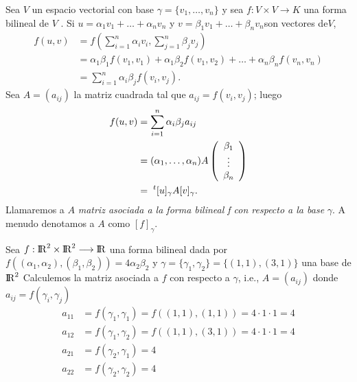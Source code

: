 			Sea $ V $ un espacio vectorial con base $ \gamma = \{v_{1} , \ldots, v_{n} \} $ y sea $ f : V \times V \rightarrow K $ una
			forma bilineal de $ V $ . Si $ u = \alpha_{1}v_{1} + \ldots + \alpha_{n} v_{n} $ y $ v = \beta_{1}v_{1} + \ldots + \beta_{n} v_{n}  $son vectores de$  V  $,
		\begin{align*}
		f(u, v) &=  f(\sum_{i=1}^{n}\alpha_{i}v_{i}, \sum_{j=1}^{n}\beta_{j}v_{j}) \\
					&= \alpha_{1} \beta_{1} f (v_{1} , v_{1 }) + \alpha_{1} \beta_{2} f (v_{1} , v_{2} ) + \ldots+ \alpha_{n}\beta_{n} f (v_{n} , v_{n} )
					\\
					&=\sum_{i=1}^{n}\alpha_{i}\beta_{j}f(v_{i}, v_{j}).
		\end{align*}
		Sea $ A = (a_{ij} ) $ la matriz cuadrada tal que $ a_{ij} = f (v_{i} , v_{j} ) $; luego
		\begin{align*}
		f(u,v) &= \sum_{i=1}^{n}\alpha_{i}\beta_{j} a_{ij} \\
		            &= (\alpha_{1},\ldots,\alpha_{n})A\left(\begin{array}{c}
		            		\beta_{1} \\ \vdots \\ \beta_{n}
		            \end{array}\right)\\
		            &=\textcolor{white}{.}^{t}[u]_{\gamma}A[v]_{\gamma}.
		\end{align*}
		Llamaremos a $ A $ \textit{matriz asociada a la forma bilineal f con respecto a la base} $\gamma$. A menudo denotamos a $ A $ como $ [f ]_{\gamma} $.
		\begin{ejem} \label{ejem2.5}
			\normalfont
			Sea $ f: {\rm I\!R}^{2} \times {\rm I\!R}^{2} \longrightarrow {\rm I\!R}$ una forma bilineal dada por $ f ((\alpha_{1}, \alpha_{2} ), (\beta_{1} , \beta_{2} )) = 4\alpha_{2}\beta_{2} $ y $ \gamma = \{\gamma_{1}, \gamma_{2}\} =  \{(1, 1), (3, 1)\} $  una base de $ {\rm I\!R}^{2} $ Calculemos la matriz asociada a $ f $ con respecto a  $\gamma$, i.e., $ A = (a_{ij} )  $ donde $ a_{ij}  = f(\gamma_{i}, \gamma_{j})$ 
			\begin{align*}
			a_{11} &= f (\gamma_{1}, \gamma_{1} ) = f ((1, 1), (1, 1)) = 4 \cdot 1 \cdot1 = 4 \\  	a_{12} &= f (\gamma_{1}, \gamma_{2} ) = f ((1, 1), (3, 1)) = 4 \cdot 1 \cdot1 = 4 \\ a_{21} &= f (\gamma_{2}, \gamma_{1} ) = 4  \\ a_{22} &= f (\gamma_{2}, \gamma_{2} ) = 4
			\end{align*}
		\end{ejem}
		
